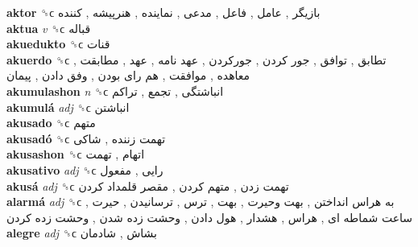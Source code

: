 \textbf{aktor} ␝ϲ   بازیگر ,  عامل ,  فاعل ,  مدعی ,  نماینده ,  هنرپیشه ,  کننده   \\
\textbf{aktua} \emph{v}  ␝ϲ   قباله   \\
\textbf{akuedukto} ␝ϲ   قنات   \\
\textbf{akuerdo} ␝ϲ   تطابق ,  توافق ,  جور کردن ,  جورکردن ,  عهد نامه ,  عهد ,  مطابقت ,  معاهده ,  موافقت ,  هم رای بودن ,  وفق دادن ,  پیمان   \\
\textbf{akumulashon} \emph{n}  ␝ϲ   انباشتگی ,  تجمع ,  تراکم   \\
\textbf{akumulá} \emph{adj}  ␝ϲ   انباشتن   \\
\textbf{akusado} ␝ϲ   متهم   \\
\textbf{akusadó} ␝ϲ   تهمت زننده ,  شاکی   \\
\textbf{akusashon} ␝ϲ   اتهام ,  تهمت   \\
\textbf{akusativo} \emph{adj}  ␝ϲ   رایی ,  مفعول   \\
\textbf{akusá} \emph{adj}  ␝ϲ   تهمت زدن ,  متهم کردن ,  مقصر قلمداد کردن   \\
\textbf{alarmá} \emph{adj}  ␝ϲ   به هراس انداختن ,  بهت وحیرت ,  بهت ,  ترس ,  ترسانیدن ,  حیرت ,  ساعت شماطه ای ,  هراس ,  هشدار ,  هول دادن ,  وحشت زده شدن ,  وحشت زده کردن   \\
\textbf{alegre} \emph{adj}  ␝ϲ   بشاش ,  شادمان   \\
